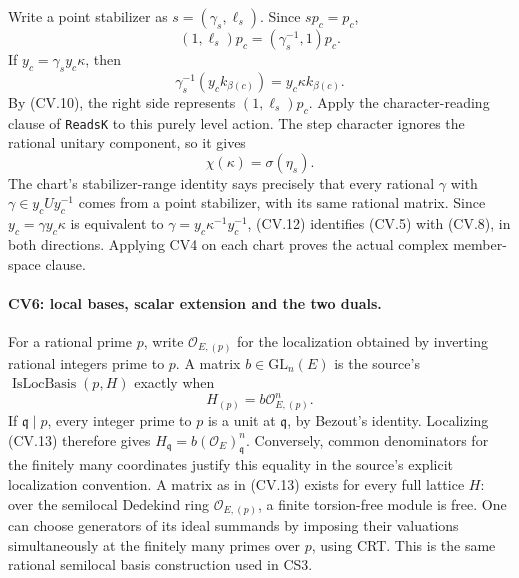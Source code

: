 Write a point stabilizer as \(s=(\gamma_s,\ell_s)\).
Since \(sp_c=p_c\),
\[
       (1,\ell_s)p_c=(\gamma_s^{-1},1)p_c.
\]
If \(y_c=\gamma_sy_c\kappa\), then
\[
       \gamma_s^{-1}(y_ck_{\beta(c)})
                     =y_c\kappa k_{\beta(c)}.
                                                               \tag{CV.11}
\]
By (CV.10), the right side represents
\((1,\ell_s)p_c\). Apply the character-reading clause of
\texttt{ReadsK} to this purely level action. The step
character ignores the rational unitary component, so it gives
\[
                    \chi(\kappa)=\sigma(\eta_s).              \tag{CV.12}
\]
The chart's stabilizer-range identity says precisely that
every rational \(\gamma\) with
\(\gamma\in y_cUy_c^{-1}\) comes from a point stabilizer,
with its same rational matrix. Since
\(y_c=\gamma y_c\kappa\) is equivalent to
\(\gamma=y_c\kappa^{-1}y_c^{-1}\), (CV.12) identifies
(CV.5) with (CV.8), in both directions. Applying CV4 on
each chart proves the actual complex member-space clause.

\paragraph{CV6: local bases, scalar extension and the two duals.}
For a rational prime \(p\), write \(\mathcal O_{E,(p)}\)
for the localization obtained by inverting rational integers
prime to \(p\). A matrix \(b\in\mathrm{GL}_n(E)\) is the
source's \(\operatorname{IsLocBasis}(p,H)\) exactly when
\[
                  H_{(p)}=b\mathcal O_{E,(p)}^n.              \tag{CV.13}
\]
If \(\mathfrak q\mid p\), every integer prime to \(p\) is a
unit at \(\mathfrak q\), by Bezout's identity. Localizing
(CV.13) therefore gives
\(H_{\mathfrak q}=b(\mathcal O_E)_{\mathfrak q}^n\).
Conversely, common denominators for the finitely many
coordinates justify this equality in the source's explicit
localization convention. A matrix as in (CV.13) exists for
every full lattice \(H\): over the semilocal Dedekind ring
\(\mathcal O_{E,(p)}\), a finite torsion-free module is free.
One can choose generators of its ideal summands by imposing
their valuations simultaneously at the finitely many primes
over \(p\), using CRT. This is the same rational semilocal
basis construction used in CS3.

